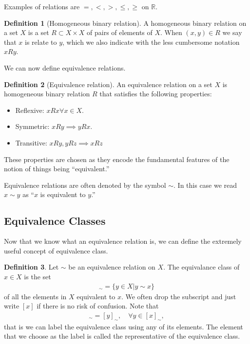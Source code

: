 \documentclass{book}
\theoremstyle{definition}
\newtheorem{defn}{Definition}[section]
\begin{document}
Examples of relations are $=,<,>, \leq, \geq$ on $\mathbb{R}$. \\

\begin{defn}[Homogeneous binary relation]
	A homogeneous binary relation on a set $X$ is a set $R \subset X \times X$ of pairs of
	elements of $X$. When $(x,y) \in R$ we say that $x$ is relate to $y$, which we also indicate with the less cumbersome notation $xRy$.  
\end{defn}

We can now define equivalence relations.



\begin{defn}[Equivalence relation]
	An equivalence relation on a set $X$ is homogeneous binary relation $R$ that satisfies the following properties:
	\begin{itemize}
		\item Reflexive: $xRx \forall x\in X$.
		\item Symmetric: $xRy \implies yRx$.
		\item Transitive: $xRy, yRz \implies xRz$
	\end{itemize}
	These properties are chosen as they encode the fundamental features of the notion of
	things being ``equivalent.''
\end{defn}

Equivalence relations are often denoted by the symbol $\sim$. In this case we read $x\sim y$ as ``$x$ is equivalent to $y$.'' 





\subsection{Equivalence Classes}

Now that we know what an equivalence relation is, we can define the extremely useful concept of equivalence class.


\begin{defn}
	Let $\sim$ be an equivalence relation on $X$. The equivalance class of $x \in X$ is the set 
	\begin{align}
	[x]_\sim = \{ y\in X \vert y\sim x   \}
	\end{align}
	of all the elements in $X$ equivalent to $x$. We often drop the subscript and just write $[x]$ if there is no risk of confusion. Note that
	\begin{align}
	[x]_\sim = [y]_\sim, \quad \forall y \in [x]_\sim,
	\end{align}
	that is we can label the equivalence class using any of its elements. The element that we
	choose as the label is called the representative of the equivalence class.
\end{defn}
\end{document}
